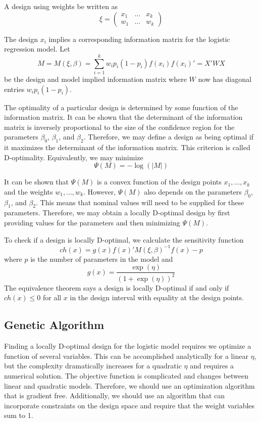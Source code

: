 \documentclass[11pt,a4paper]{article}
\begin{document}
\par A design using weights be written as
$$
\xi =
\begin{pmatrix}
x_1 & \dots & x_k\\
w_1 & \dots & w_k
\end{pmatrix}
$$

The design $x_i$ implies a corresponding information matrix for the logistic regression model. Let
$$
M = M(\xi, \beta) = \sum_{i=1}^k w_ip_i (1-p_i) f(x_i) f(x_i)' = X'WX
$$
be the design and model implied information matrix where $W$ now has diagonal entries $w_i p_i (1-p_i)$.

The optimality of a particular design is determined by some function of the information matrix. It can be shown that the determinant of the information matrix is inversely proportional to the size of the confidence region for the parameters $\beta_0$, $\beta_1$, and $\beta_2$. Therefore, we may define a design as being optimal if it maximizes the determinant of the information matrix. This criterion is called D-optimality. Equivalently, we may minimize
$$
\Psi(M) = -\log(|M|)
$$

It can be shown that $\Psi(M)$ is a convex function of the design points $x_1, \dots, x_k$ and  the weights $w_1, \dots, w_k$. However, $\Psi(M)$ also depends on the parameters $\beta_0$, $\beta_1$, and $\beta_2$. This means that nominal values will need to be supplied for these parameters. Therefore, we may obtain a locally D-optimal design by first providing values for the parameters and then minimizing $\Psi(M)$.

To check if a design is locally D-optimal, we calculate the sensitivity function
$$
ch(x) = g(x) f(x)'M(\xi, \beta)^{-1} f(x) - p
$$
where $p$ is the number of parameters in the model and
$$
g(x) = \frac{\exp(\eta)}{(1+\exp(\eta))^2}
$$
The equivalence theorem says a design is locally D-optimal if and only if $ch(x) \leq 0 $ for all $x$ in the design interval with equality at the design points.


\subsection{Genetic Algorithm}
Finding a locally D-optimal design for the logistic model requires we optimize a function of several variables. This can be accomplished analytically for a linear $\eta$, but the complexity dramatically increases for a quadratic $\eta$ and requires a numerical solution. The objective function is complicated and changes between linear and quadratic models. Therefore, we should use an optimization algorithm that is gradient free. Additionally, we should use an algorithm that can incorporate constraints on the design space and require that the weight variables sum to 1.
\end{document}

